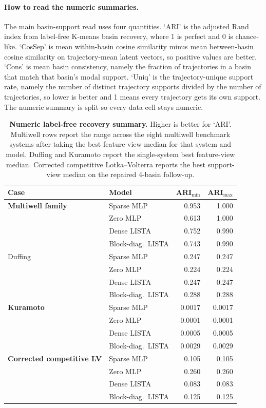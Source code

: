 \paragraph{How to read the numeric summaries.}
The main basin-support read uses four quantities. `ARI' is the adjusted Rand
index from label-free K-means basin recovery, where 1 is perfect and 0 is
chance-like. `CosSep' is mean within-basin cosine similarity minus mean
between-basin cosine similarity on trajectory-mean latent vectors, so positive
values are better. `Cons' is mean basin consistency, namely the fraction of
trajectories in a basin that match that basin's modal support. `Uniq' is the
trajectory-unique support rate, namely the number of distinct trajectory
supports divided by the number of trajectories, so lower is better and 1 means
every trajectory gets its own support. The numeric summary is split so every
data cell stays numeric.

\begin{table}[ht]
\centering
\scriptsize
\setlength{\tabcolsep}{6pt}
\begin{tabular}{p{}p{}rr}
\toprule
Case & Model & ARI$_{\min}$ & ARI$_{\max}$ \\
\midrule
\textbf{Multiwell family} & Sparse MLP & 0.953 & 1.000 \\
& Zero MLP & 0.613 & 1.000 \\
& Dense LISTA & 0.752 & 0.990 \\
& Block-diag.\ LISTA & 0.743 & 0.990 \\
\midrule
Duffing & Sparse MLP & 0.247 & 0.247 \\
& Zero MLP & 0.224 & 0.224 \\
& Dense LISTA & 0.247 & 0.247 \\
& Block-diag.\ LISTA & 0.288 & 0.288 \\
\midrule
\textbf{Kuramoto} & Sparse MLP & 0.0017 & 0.0017 \\
& Zero MLP & -0.0001 & -0.0001 \\
& Dense LISTA & 0.0005 & 0.0005 \\
& Block-diag.\ LISTA & 0.0029 & 0.0029 \\
\midrule
\textbf{Corrected competitive LV} & Sparse MLP & 0.105 & 0.105 \\
& Zero MLP & 0.260 & 0.260 \\
& Dense LISTA & 0.083 & 0.083 \\
& Block-diag.\ LISTA & 0.125 & 0.125 \\
\bottomrule
\end{tabular}
\caption{\textbf{Numeric label-free recovery summary.} Higher is better for `ARI'. Multiwell rows report the range across the eight multiwell benchmark systems after taking the best feature-view median for that system and model. Duffing and Kuramoto report the single-system best feature-view median. Corrected competitive Lotka--Volterra reports the best support-view median on the repaired 4-basin follow-up.}
\label{tab:review-mechanism-recovery-20260314}
\end{table}

